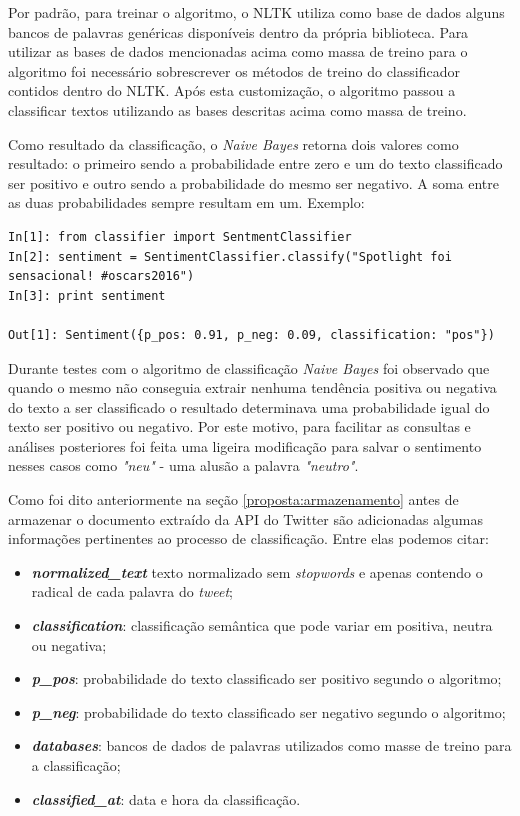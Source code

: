 Por padrão, para treinar o algoritmo, o NLTK utiliza como base de dados alguns bancos de palavras genéricas disponíveis dentro da própria biblioteca. Para utilizar as bases de dados mencionadas acima como massa de treino para o algoritmo foi necessário sobrescrever os métodos de treino do classificador contidos dentro do NLTK. Após esta customização, o algoritmo passou a classificar textos utilizando as bases descritas acima como massa de treino.

Como resultado da classificação, o \textit{Naive Bayes} retorna dois valores como resultado: o primeiro sendo a probabilidade entre zero e um do texto classificado ser positivo e outro sendo a probabilidade do mesmo ser negativo. A soma entre as duas probabilidades sempre resultam em um. Exemplo:

\begin{lstlisting}[style=python, frame=single]
In[1]: from classifier import SentmentClassifier
In[2]: sentiment = SentimentClassifier.classify("Spotlight foi sensacional! #oscars2016")
In[3]: print sentiment

Out[1]: Sentiment({p_pos: 0.91, p_neg: 0.09, classification: "pos"})

\end{lstlisting}

Durante testes com o algoritmo de classificação \textit{Naive Bayes} foi observado que quando o mesmo não conseguia extrair nenhuma tendência positiva ou negativa do texto a ser classificado o resultado determinava uma probabilidade igual do texto ser positivo ou negativo. Por este motivo, para facilitar as consultas e análises posteriores foi feita uma ligeira modificação para salvar o sentimento nesses casos como \textit{"neu"} - uma alusão a palavra \textit{"neutro"}.

Como foi dito anteriormente na seção \ref{proposta:armazenamento} antes de armazenar o documento extraído da API do Twitter são adicionadas algumas informações pertinentes ao processo de classificação. Entre elas podemos citar:

\begin{itemize}
	\item \textit{\textbf{normalized\_text}} texto normalizado sem \textit{stopwords} e apenas contendo o radical de cada palavra do \textit{tweet};
	\item \textit{\textbf{classification}}: classificação semântica que pode variar em positiva, neutra ou negativa;
	\item \textit{\textbf{p\_pos}}: probabilidade do texto classificado ser positivo segundo o algoritmo;
	\item \textit{\textbf{p\_neg}}: probabilidade do texto classificado ser negativo segundo o algoritmo;
	\item \textit{\textbf{databases}}: bancos de dados de palavras utilizados como masse de treino para a classificação;
	\item \textit{\textbf{classified\_at}}: data e hora da classificação.
\end{itemize}

